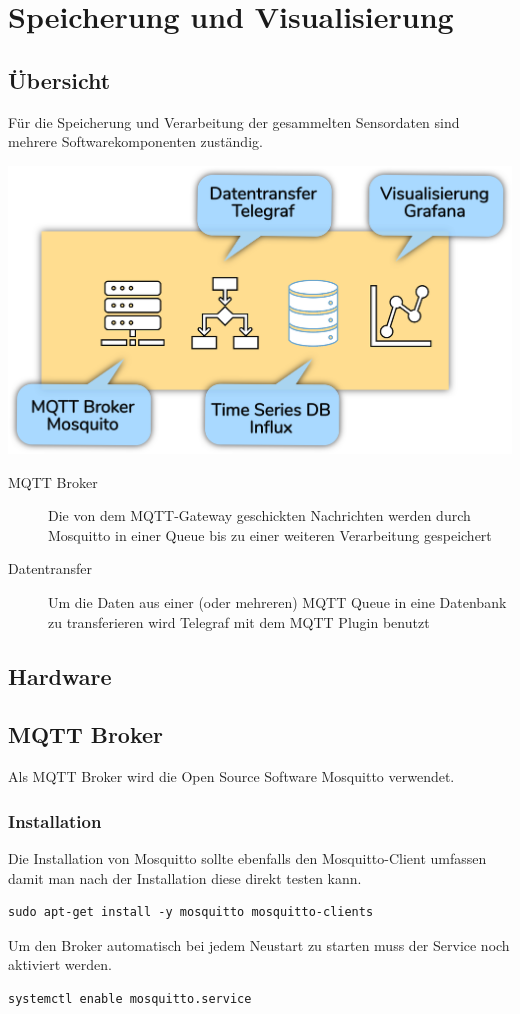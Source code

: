 \documentclass[
  12pt, %
  a4paper, %
  twoside, %
  openany, %
  numbers=noenddot, %
  BCOR=5mm, %
  parskip=half*, %
  thesis, %
]{bfhbook}
\begin{document}
\chapter{Speicherung und Visualisierung}
\section{Übersicht}
Für die Speicherung und Verarbeitung der gesammelten Sensordaten sind mehrere Softwarekomponenten zuständig.
\begin{center}
\includegraphics[width=17cm, left]{Bilder/Raspberry-Software.png}%
\label{labelname}%
\end{center}
 \begin{description}
\item[MQTT Broker] Die von dem MQTT-Gateway geschickten Nachrichten werden durch Mosquitto \cite{mosquitto} in einer Queue bis zu einer weiteren Verarbeitung gespeichert
\item[Datentransfer] Um die Daten aus einer (oder mehreren) MQTT Queue in eine Datenbank zu transferieren wird Telegraf \cite{telegraf} mit dem MQTT Plugin benutzt \cite{telegrafmqtt}
\end{description}
\section{Hardware}
\section{MQTT Broker}
Als MQTT Broker wird die Open Source Software Mosquitto \cite{mosquitto} verwendet.
\subsection{Installation}
Die Installation von Mosquitto sollte ebenfalls den Mosquitto-Client umfassen damit man nach der Installation diese direkt testen kann.
\begin{verbatim}
sudo apt-get install -y mosquitto mosquitto-clients
   \end{verbatim}
 Um den Broker automatisch bei jedem Neustart zu starten muss der Service noch aktiviert werden.
 \begin{verbatim}
systemctl enable mosquitto.service
 \end{verbatim}
\end{document}
